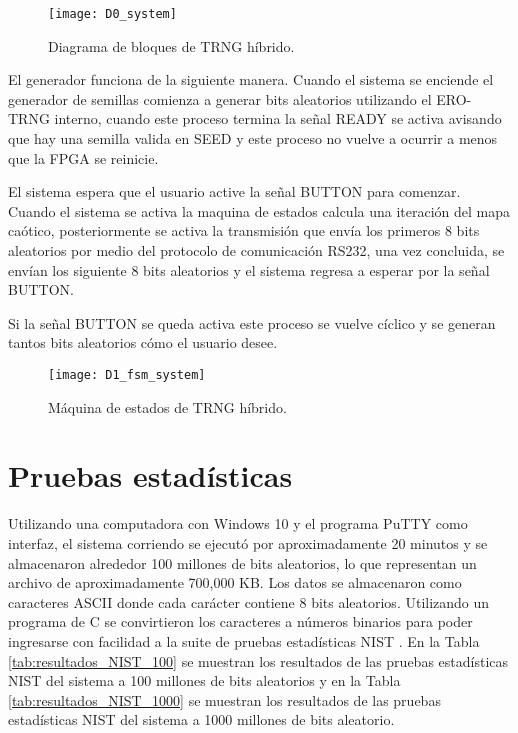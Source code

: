         \begin{figure}[hbtp]
            \caption{Diagrama de bloques de TRNG híbrido.}
            \centering
            \texttt{[image: D0\_system]}
            \label{fig:D0_system}
        \end{figure}

        El generador funciona de la siguiente manera. Cuando el sistema se enciende el generador de semillas comienza a generar bits aleatorios utilizando el ERO-TRNG interno, cuando este proceso termina la señal READY se activa avisando que hay una semilla valida en SEED y este proceso no vuelve a ocurrir a menos que la FPGA se reinicie.

       El sistema espera que el usuario active la señal BUTTON para comenzar. Cuando el sistema se activa la maquina de estados calcula una iteración del mapa caótico, posteriormente se activa la transmisión que envía los primeros 8 bits aleatorios por medio del protocolo de comunicación RS232, una vez concluida, se envían los siguiente 8 bits aleatorios y el sistema regresa a esperar por la señal BUTTON. 

       Si la señal BUTTON se queda activa este proceso se vuelve cíclico y se generan tantos bits aleatorios cómo el usuario desee.

       \begin{figure}[hbtp]
            \caption{Máquina de estados de TRNG híbrido.}
            \centering
            \texttt{[image: D1\_fsm\_system]}
            \label{fig:D1_fsm_system}
        \end{figure}

        \section{Pruebas estadísticas}

        Utilizando una computadora con Windows 10 y el programa PuTTY como interfaz, el sistema corriendo se ejecutó por aproximadamente 20 minutos y se almacenaron alrededor 100 millones de bits aleatorios, lo que representan un archivo de aproximadamente 700,000 KB. Los datos se almacenaron como caracteres ASCII donde cada carácter contiene 8 bits aleatorios. Utilizando un programa de C se convirtieron los caracteres a números binarios para poder ingresarse con facilidad a la suite de pruebas estadísticas NIST \cite{Nist2010,Turan2018}. En la Tabla \ref{tab:resultados_NIST_100} se muestran los resultados de las pruebas estadísticas NIST del sistema a 100 millones de bits aleatorios y en la Tabla \ref{tab:resultados_NIST_1000} se muestran los resultados de las pruebas estadísticas NIST del sistema a 1000 millones de bits aleatorio.

